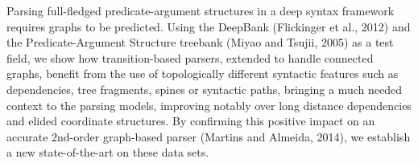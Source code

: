 Parsing full-fledged predicate-argument structures in a deep syntax framework requires graphs to be predicted. Using the DeepBank (Flickinger et al., 2012) and the Predicate-Argument Structure treebank (Miyao and Tsujii, 2005) as a test field, we show how transition-based parsers, extended to handle connected graphs, benefit from the use of topologically different syntactic features such as dependencies, tree fragments, spines or syntactic paths, bringing a much needed context to the parsing models, improving notably over long distance dependencies and elided coordinate structures. By confirming this positive impact on an accurate 2nd-order graph-based parser (Martins and Almeida, 2014), we establish a new state-of-the-art on these data sets.
